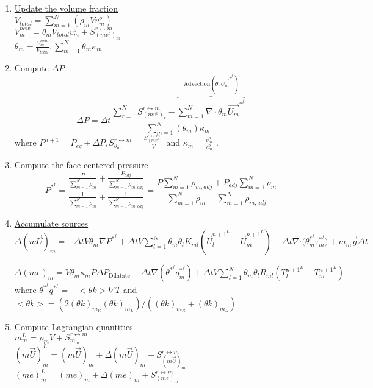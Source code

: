 \documentclass[fleqn]{article}
\newcommand{\SUM}[1]    {\ensuremath{\sum \limits_{{#1}=1}^N }}
\newcommand{\bigS}[1]   {\ensuremath{S^{r \leftrightarrow m}_{#1}}  }
\newcommand{\U}         {{\vec{U}}}
\newcommand{\delt}      {\ensuremath{\Delta{t}} }
\begin{document}
\begin{enumerate}
\item \underline{Update the volume fraction}\\
$V_{total} = \SUM{m}(\rho_m V v^o_m)$\\
$V_m^{new} = \theta_m V_{total}  v^o_m + \bigS{(m v^o)_m}$\\
$\theta_m = \frac{V_m^{new}}{V_{total}}, \SUM{m} \theta_m \kappa_m $
\item \underline{Compute $\Delta P$} 
\[
     \Delta P = \Delta t 
                        \frac{   \SUM{r}  \bigS{(m v^o)_r}
                      - \overbrace { \SUM{m} \nabla \cdot \theta_m \vec{U_m}^{*^{f}} } ^{\text{Advection}(\theta, \vec{U_m}^{*^{f}}) } }
                       {\SUM{m} (\theta_m) \kappa_m}
\]
where $P^{n+1} = P_{eq} + \Delta{P}, \bigS{\theta_m} = \frac{ \bigS{(m v^o)}}{V}$
and $\kappa_m = \frac{v^o_m}{c^2_m}$ .
\item \underline{Compute the face centered pressure}
\[
    P^{*^{f}} = \frac{\frac{P}{\SUM{m} \rho_m} + \frac{P_{adj}}{\SUM{m} \rho_{m, adj}}}
                     {\frac{1}{\SUM{m} \rho_m} + \frac{1}{\SUM{m} \rho_{m, adj}}}
%
              =\frac{ {P \SUM{m} \rho_{m,adj}} + {P_{adj} \SUM{m} \rho_{m} }  }
                 { {\SUM{m} \rho_m} + {\SUM{m} \rho_{m, adj}  }  }
\]
\newpage
\item \underline{Accumulate sources}\\  
 $\Delta(m\vec{U})_m = 
    - \delt V \theta_m \nabla{ P^{*^f}} 
    + \delt V \SUM{l} \theta_m \theta_l K_{ml}(\U_l^{{n+1}^L} - \U_m^{{n+1}^L} )
    + \delt \nabla{ \cdot (\theta^{*^f}_m \tau^{*^f}_m})
    + m_m \vec{g}\delt$
    
 $\Delta(me)_m =  
    V \theta_m \kappa_m P \Delta P_{\text{Dilatate}}
    - \delt \nabla (\theta^{*^f} q_{m}^{*^f})
    + \delt V \SUM{l}  \theta_m \theta_l R_{ml}(T_l^{{n+1}^L} - T_m^{{n+1}^L} )$ \\
where $\theta^{*^f}q^{*^f} = - <\theta k> \nabla T$ and 
${<}\theta k{>} = (2 (\theta k)_{m_R} (\theta k)_{m_L} )/((\theta k)_{m_R}  + (\theta k)_{m_L} )$

\item \underline{Compute Lagrangian quantities}\\
    $m^L_m     = {\rho_m}V + \bigS{m_m} $ \\
    $(m\U)^L_m = (m\U)_m + \Delta(m\U)_m + \bigS{(m\U)_m}$ \\
    $(m e)^L_m = (m e)_m + \Delta(m e)_m + \bigS{(me)_m}$\\


\end{enumerate}
\end{document}
